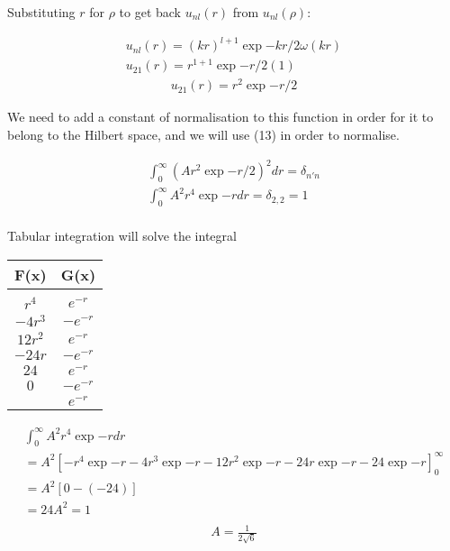 \documentclass{article}
\begin{document}
    
    
    Substituting $r$ for $\rho$ to get back $u_{nl}(r)$ from $u_{nl}(\rho)$:\medskip



    \begin{gather*}
        u_{nl}(r) = (kr)^{l+1}\exp{-kr/2}\omega(kr)\\
        u_{21}(r) = r^{1+1}\exp{-r/2}(1)
    \end{gather*}
    \begin{gather}
        u_{21}(r) = r^{2}\exp{-r/2}
    \end{gather}

    We need to add a constant of normalisation to this function in order for it to belong to the Hilbert space,
    and we will use (13) in order to normalise.

    \begin{gather*}
        \int_{0}^{\infty} (Ar^{2}\exp{-r/2})^2dr = \delta_{n'n}\\
        \int_{0}^{\infty} A^2r^{4}\exp{-r}dr = \delta_{2,2} = 1\\
    \end{gather*}

    Tabular integration will solve the integral

    \begin{table}[h]
        \centering
        \begin{tabular}{cc}
        \hline
        \multicolumn{1}{|c|}{F(x)} & \multicolumn{1}{c|}{G(x)} \\ \hline
                 &  \\ 
         $r^4$   & $e^{-r}$ \\
         $-4r^3$  & $-e^{-r}$ \\
         $12r^2$ & $e^{-r}$ \\
         $-24r$ & $-e^{-r}$ \\
         $24$    & $e^{-r}$ \\
         $0$     & $-e^{-r}$ \\
                 & $e^{-r}$ \\ \hline
        \end{tabular}
    \end{table}

    \begin{gather*}
        \int_{0}^{\infty} A^2r^{4}\exp{-r}dr  \\
        = A^2[-r^4\exp{-r} - 4r^3\exp{-r} - 12r^2\exp{-r} - 24r\exp{-r} -24\exp{-r}]^{\infty}_{0}\\
        = A^2[0 - (-24)]\\
        = 24A^2 = 1\\
    \end{gather*}\vspace{-1.5cm}
    \begin{gather} 
        A = \frac{1}{2\sqrt{6}} 
    \end{gather}
        
\end{document}
